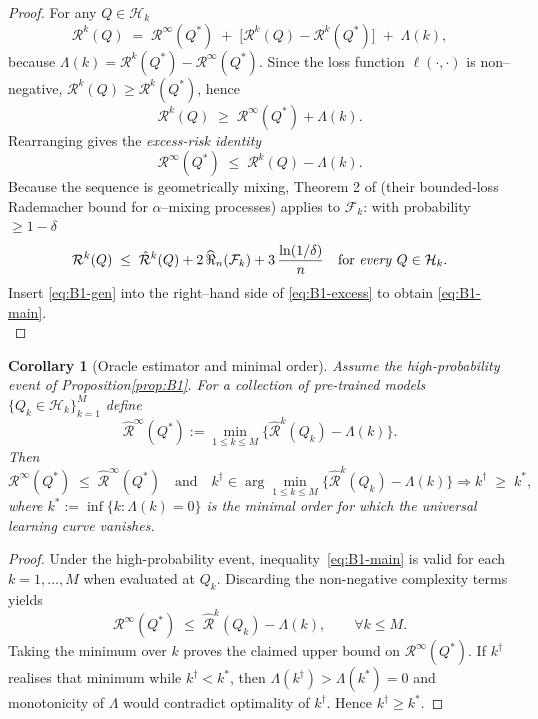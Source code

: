 \documentclass{article}
\newtheorem{corollary}[theorem]{Corollary}
\begin{document}
\begin{proof}
For any $Q\in\mathcal H_k$
\[
   \mathcal R^{k}(Q)
   \;=\;
   \mathcal R^{\infty}(Q^{*})
   \;+\;
   \bigl[\mathcal R^{k}(Q)-\mathcal R^{k}(Q^{*})\bigr]
   \;+\;\Lambda(k),
\]
because
$\Lambda(k)=\mathcal R^{k}(Q^{*})-\mathcal R^{\infty}(Q^{*})$.
Since the loss function $\ell(\cdot,\cdot)$ is non–negative,
$\mathcal R^{k}(Q)\ge\mathcal R^{k}(Q^{*})$, hence
\[
   \mathcal R^{k}(Q)
   \;\ge\;
   \mathcal R^{\infty}(Q^{*}) + \Lambda(k).
\]
Rearranging gives the \emph{excess-risk identity}
\begin{equation}\label{eq:B1-excess}
   \mathcal R^{\infty}(Q^{*})
   \;\le\;
   \mathcal R^{k}(Q) - \Lambda(k).
\end{equation}
Because the sequence is geometrically mixing,
Theorem 2 of \citet{mcdonald2011rademacher} (their bounded‐loss
Rademacher bound for $\alpha$–mixing processes) applies to
$\mathcal F_k$: with probability $\ge1-\delta$
\begin{equation}\label{eq:B1-gen}
   \mathcal R^{k}(Q)
   \;\le\;
   \hat{\mathcal R}^{k}(Q)
   +2\,\widehat{\Re}_n(\mathcal F_k)
   +3\,\frac{\ln(1/\delta)}{n}
   \quad\text{for \emph{every} }Q\in\mathcal H_k.
\end{equation}
Insert \eqref{eq:B1-gen} into the right–hand side of
\eqref{eq:B1-excess} to obtain \eqref{eq:B1-main}.\\
\end{proof}

\begin{corollary}[Oracle estimator and minimal order]
\label{cor:B2}
Assume the high-probability event of Proposition\;\ref{prop:B1}.
For a collection of pre-trained models
$\{Q_k\in\mathcal H_k\}_{k=1}^{M}$ define
\[
   \hat{\mathcal R}^{\infty}(Q^{*})
   :=\min_{1\le k\le M}
     \bigl\{\hat{\mathcal R}^{k}(Q_k)-\Lambda(k)\bigr\}.
\]
Then
\[
   \mathcal R^{\infty}(Q^{*})
   \;\le\;
   \hat{\mathcal R}^{\infty}(Q^{*})
   \quad\text{and}\quad
   k^{\dagger}\in\arg\min_{1\le k\le M}
      \bigl\{\hat{\mathcal R}^{k}(Q_k)-\Lambda(k)\bigr\}
   \Longrightarrow 
   k^{\dagger}\;\ge\;k^{*},
\]
where $k^{*}:=\inf\{k:\Lambda(k)=0\}$ is the minimal order for which the
universal learning curve vanishes.
\end{corollary}

\begin{proof}
Under the high-probability event,
inequality~\eqref{eq:B1-main} is valid for each
$k=1,\dots,M$ when evaluated at $Q_k$.
Discarding the non-negative complexity terms yields
\[
   \mathcal R^{\infty}(Q^{*})
   \;\le\;
   \hat{\mathcal R}^{k}(Q_k)-\Lambda(k),
   \qquad \forall k\le M.
\]
Taking the minimum over $k$ proves the claimed upper bound on
$\mathcal R^{\infty}(Q^{*})$.
If $k^{\dagger}$ realises that minimum while $k^{\dagger}<k^{*}$,
then $\Lambda(k^{\dagger})>\Lambda(k^{*})=0$ and monotonicity of
$\Lambda$ would contradict optimality of $k^{\dagger}$.  Hence
$k^{\dagger}\ge k^{*}$.
\end{proof}
\end{document}
